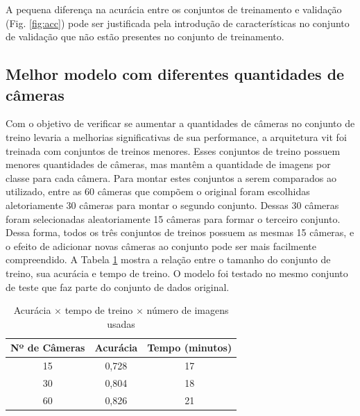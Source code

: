 A pequena diferença na acurácia entre os conjuntos de treinamento e validação (Fig. \ref{fig:acc}) pode ser justificada pela introdução de 
características no conjunto de validação que não estão presentes no conjunto de treinamento. 
\subsection{Melhor modelo com diferentes quantidades de câmeras}\label{sec:cameraquantity}

Com o objetivo de verificar se aumentar a quantidades de câmeras no conjunto de treino levaria a melhorias significativas de sua performance, 
a arquitetura \acrshort{vit} foi treinada com conjuntos de treinos menores. 
Esses conjuntos de treino possuem menores quantidades de câmeras, mas mantêm a quantidade de imagens por classe para cada câmera.
Para montar estes conjuntos a serem comparados ao utilizado, entre as 60 câmeras que compõem o original foram escolhidas aletoriamente 30 câmeras para montar o segundo conjunto.
Dessas 30 câmeras foram selecionadas aleatoriamente 15 câmeras para formar o terceiro conjunto.
Dessa forma, todos os três conjuntos de treinos possuem as mesmas 15 câmeras, e o efeito de adicionar novas câmeras ao conjunto pode ser mais facilmente compreendido.
A Tabela \ref{tab:trainingimages} mostra a relação entre o tamanho do conjunto de treino, sua acurácia e tempo de treino. 
O modelo foi testado no mesmo conjunto de teste que faz parte do conjunto de dados original.

\begin{table}[!ht]
\begin{center}
\caption{Acurácia $\times$ tempo de treino $\times$ número de imagens usadas}
\label{tab:trainingimages}
\begin{tabular}{c|cc}
\toprule
\textbf{\textbf{Nº de Câmeras}} & \textbf{Acurácia} & \textbf{Tempo (minutos)}\\
\midrule
15 &  0,728 & 17\\
30 & 0,804 & 18 \\
60 & 0,826 & 21 \\
\bottomrule
\end{tabular}
\end{center}
\end{table}

